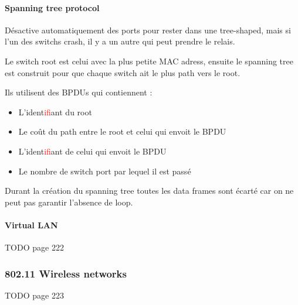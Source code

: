 \paragraph{Spanning tree protocol}
Désactive automatiquement des ports pour rester dans une tree-shaped, mais si l'un
des switchs crash, il y a un autre qui peut prendre le relais.

Le switch root est celui avec la plus petite MAC adress, ensuite le spanning tree est construit
pour que chaque switch ait le plus path vers le root.

Ils utilisent des BPDUs qui contiennent :
\begin{itemize}
    \item L'ident\textcolor{red}{if}iant du root
    \item Le coût du path entre le root et celui qui envoit le BPDU
    \item L'ident\textcolor{red}{if}iant de celui qui envoit le BPDU
    \item Le nombre de switch port par lequel il est passé
\end{itemize}


Durant la création du spanning tree toutes les data frames sont écarté
car on ne peut pas garantir l'absence de loop.


\paragraph{Virtual LAN}

TODO page 222

\subsubsection{802.11 Wireless networks}

TODO page 223

\biblio


